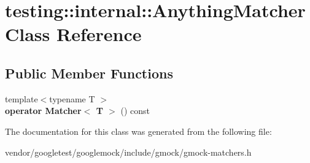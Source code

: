 \hypertarget{classtesting_1_1internal_1_1AnythingMatcher}{}\section{testing\+:\+:internal\+:\+:Anything\+Matcher Class Reference}
\label{classtesting_1_1internal_1_1AnythingMatcher}
\subsection*{Public Member Functions}
\begin{DoxyCompactItemize}
\item 
{\footnotesize template$<$typename T $>$ }\\{\bfseries operator Matcher$<$ T $>$} () const \hypertarget{classtesting_1_1internal_1_1AnythingMatcher_ae70d544c1edeb84ef27e845cf1c4e755}{}\label{classtesting_1_1internal_1_1AnythingMatcher_ae70d544c1edeb84ef27e845cf1c4e755}

\end{DoxyCompactItemize}


The documentation for this class was generated from the following file\+:\begin{DoxyCompactItemize}
\item 
vendor/googletest/googlemock/include/gmock/gmock-\/matchers.\+h\end{DoxyCompactItemize}
